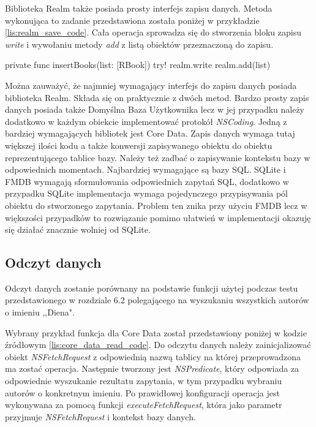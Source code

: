 Biblioteka Realm także posiada prosty interfejs zapisu danych. Metoda wykonująca to zadanie przedstawiona została poniżej w przykładzie \ref{lis:realm_save_code}. Cała operacja sprowadza się do stworzenia bloku zapisu \textit{write} i wywołaniu metody \textit{add} z listą obiektów przeznaczoną do zapisu. 

\begin{code}[
		language=swift,
		caption={Przykład zapisu obiektu Realm},
		label={lis:realm_save_code},
	]
    private func insertBooks(list: [RBook]) {
        try! realm.write {
            realm.add(list)
        }
    }
\end{code}

Można zauważyć, że najmniej wymagający interfejs do zapisu danych posiada biblioteka Realm. Składa się on praktycznie z dwóch metod. Bardzo prosty zapis danych posiada także Domyślna Baza Użytkownika lecz w jej przypadku należy dodatkowo w każdym obiekcie implementować protokół \textit{NSCoding}. Jedną z bardziej wymagających bibliotek jest Core Data. Zapis danych wymaga tutaj większej ilości kodu a także konwersji zapisywanego obiektu do obiektu reprezentującego tablice bazy. Należy też zadbać o zapisywanie kontekstu bazy w odpowiednich momentach. Najbardziej wymagające są bazy SQL. SQLite i FMDB wymagają sformułowania odpowiednich zapytań SQL, dodatkowo w przypadku SQLite implementacja wymaga pojedynczego przypisywania pól obiektu do stworzonego zapytania. Problem ten znika przy użyciu FMDB lecz w większości przypadków to rozwiązanie pomimo ułatwień w implementacji okazuję się działać znacznie wolniej od SQLite. 

\subsection{Odczyt danych}
Odczyt danych zostanie porównany na podstawie funkcji użytej podczas testu przedstawionego w rozdziale 6.2 polegającego na wyszukaniu wszystkich autorów o imieniu ,,Diena". 

Wybrany przykład funkcja dla Core Data został przedstawiony poniżej w kodzie źródłowym \ref{lis:core_data_read_code}. Do odczytu danych należy zainicjalizować obiekt \textit{NSFetchRequest} z odpowiednią nazwą tablicy na której przeprowadzona ma zostać operacja. Następnie tworzony jest \textit{NSPredicate}, który odpowiada za odpowiednie wyszukanie rezultatu zapytania, w tym przypadku wybraniu autorów o konkretnym imieniu. Po prawidłowej konfiguracji operacja jest wykonywana za pomocą funkcji \textit{executeFetchRequest}, która jako parametr przyjmuje \textit{NSFetchRequest} i kontekst bazy danych.

